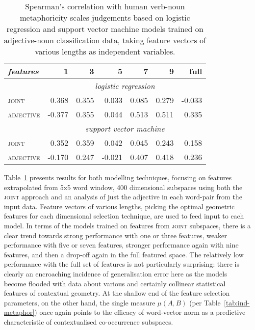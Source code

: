 \begin{table}
\centering
\begin{tabular}{lrrrrrr}
\hline
\emph{features} & 1 & 3 & 5 & 7 & 9 & full \\
\hline
& \multicolumn{6}{c}{\emph{logistic regression}} \\
\textsc{joint} & 0.368 & 0.355 & 0.033 & 0.085 & 0.279 & -0.033 \\
\textsc{adjective} & -0.377 & 0.355 & 0.044 & 0.513 & 0.511 & 0.335 \\
\hline
& \multicolumn{6}{c}{\emph{support vector machine}} \\
\textsc{joint} & 0.352 & 0.359 & 0.042 & 0.045 & 0.243 & 0.158 \\
\textsc{adjective} & -0.170 & 0.247 & -0.021 & 0.407 & 0.418 & 0.236 \\
\hline
\end{tabular}
\caption[Scoring Metaphoricity Based On Classification Data]{Spearman's correlation with human verb-noun metaphoricity scales judgements based on logistic regression and support vector machine models trained on adjective-noun classification data, taking feature vectors of various lengths as independent variables.}
\label{tab:verblearn}
\end{table}

Table~\ref{tab:verblearn} presents results for both modelling techniques, focusing on features extrapolated from 5x5 word window, 400 dimensional subspaces using both the \textsc{joint} approach and an analysis of just the adjective in each word-pair from the input data.  Feature vectors of various lengths, picking the optimal geometric features for each dimensional selection technique, are used to feed input to each model.  In terms of the models trained on features from \textsc{joint} subspaces, there is a clear trend towards strong performance with one or three features, weaker performance with five or seven features, stronger performance again with nine features, and then a drop-off again in the full featured space.  The relatively low performance with the full set of features is not particularly surprising: there is clearly an encroaching incidence of generalisation error here as the models become flooded with data about various and certainly collinear statistical features of contextual geometry.  At the shallow end of the feature selection parameters, on the other hand, the single measure $\mu(A,B)$ (per Table~\ref{tab:ind-metaphor}) once again points to the efficacy of word-vector norm as a predictive characteristic of contextualised co-occurrence subspaces.

